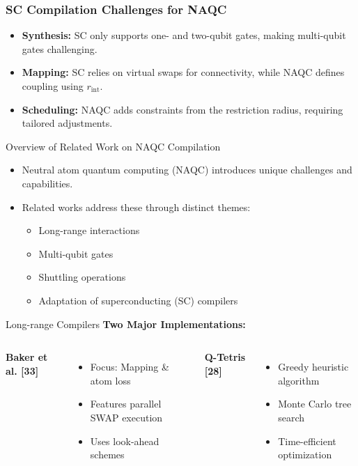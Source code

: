 \documentclass{beamer}
\begin{document}
\begin{frame}
\frametitle{SC Compilation Challenges for NAQC}
\begin{itemize}
    \item \textbf{Synthesis:} 
    SC only supports one- and two-qubit gates, making multi-qubit gates challenging.
    \item \textbf{Mapping:} 
    SC relies on virtual swaps for connectivity, while NAQC defines coupling using \(r_{\text{int}}\).
    \item \textbf{Scheduling:} 
    NAQC adds constraints from the restriction radius, requiring tailored adjustments.
\end{itemize}
\end{frame}


\begin{frame}{Overview of Related Work on NAQC Compilation}
    \begin{itemize}
        \item Neutral atom quantum computing (NAQC) introduces unique challenges and capabilities.
        \item Related works address these through distinct themes:
        \begin{itemize}
            \item Long-range interactions
            \item Multi-qubit gates
            \item Shuttling operations
            \item Adaptation of superconducting (SC) compilers
        \end{itemize}
    \end{itemize}
\end{frame}

\begin{frame}{Long-range Compilers}
    \textbf{Two Major Implementations:}
    \vspace{0.5em}
    
    \begin{columns}
        \textbf{Baker et al. [33]}
        \begin{itemize}
            \item Focus: Mapping \& atom loss
            \item Features parallel SWAP execution
            \item Uses look-ahead schemes
        \end{itemize}
        
        \textbf{Q-Tetris [28]}
        \begin{itemize}
            \item Greedy heuristic algorithm
            \item Monte Carlo tree search
            \item Time-efficient optimization
        \end{itemize}
    \end{columns}
\end{frame}
\end{document}
